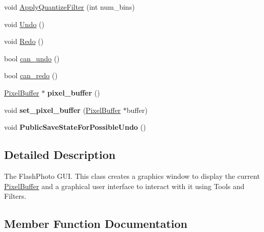 \begin{DoxyCompactItemize}
\item 
void \hyperlink{classimage__tools_1_1FlashPhotoApp_a960f826e98d590b80c4619916a945303}{Apply\+Quantize\+Filter} (int num\+\_\+bins)
\item 
void \hyperlink{classimage__tools_1_1FlashPhotoApp_a03106fe64664faa7eedab93bd91b6b11}{Undo} ()
\item 
void \hyperlink{classimage__tools_1_1FlashPhotoApp_ae5c00d6fcdd2ec8a7979104793273c0a}{Redo} ()
\item 
bool \hyperlink{classimage__tools_1_1FlashPhotoApp_a2699fa48bf3912260480ec4f966af03c}{can\+\_\+undo} ()
\item 
bool \hyperlink{classimage__tools_1_1FlashPhotoApp_aa7fa6acb2590551d56f0130d94814b95}{can\+\_\+redo} ()
\item 
\mbox{\label{classimage__tools_1_1FlashPhotoApp_a5c14458e3dc792193829b0265574927a}} 
\hyperlink{classimage__tools_1_1PixelBuffer}{Pixel\+Buffer} $\ast$ {\bfseries pixel\+\_\+buffer} ()
\item 
\mbox{\label{classimage__tools_1_1FlashPhotoApp_abc982c3bad021cf9f4ff7a726dc98046}} 
void {\bfseries set\+\_\+pixel\+\_\+buffer} (\hyperlink{classimage__tools_1_1PixelBuffer}{Pixel\+Buffer} $\ast$buffer)
\item 
\mbox{\label{classimage__tools_1_1FlashPhotoApp_a6b757e107ece48fa4f92fef9830b049f}} 
void {\bfseries Public\+Save\+State\+For\+Possible\+Undo} ()
\end{DoxyCompactItemize}


\subsection{Detailed Description}
The Flash\+Photo G\+UI. This class creates a graphics window to display the current \hyperlink{classimage__tools_1_1PixelBuffer}{Pixel\+Buffer} and a graphical user interface to interact with it using Tools and Filters. 

\subsection{Member Function Documentation}
\mbox{\label{classimage__tools_1_1FlashPhotoApp_a1ede0fe70602cbe2d50a3123eda8a937}} 

